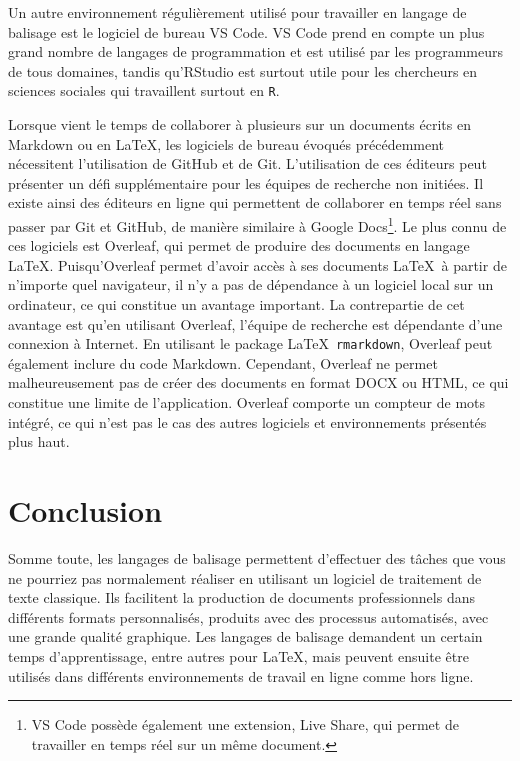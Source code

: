 \documentclass[
  letterpaper,
]{scrbook}
\begin{document}
Un autre environnement régulièrement utilisé pour travailler en langage
de balisage est le logiciel de bureau VS Code. VS Code prend en compte
un plus grand nombre de langages de programmation et est utilisé par les
programmeurs de tous domaines, tandis qu'RStudio est surtout utile pour
les chercheurs en sciences sociales qui travaillent surtout en
\texttt{R}.

Lorsque vient le temps de collaborer à plusieurs sur un documents écrits
en Markdown ou en \LaTeX, les logiciels de bureau évoqués précédemment
nécessitent l'utilisation de GitHub et de Git. L'utilisation de ces
éditeurs peut présenter un défi supplémentaire pour les équipes de
recherche non initiées. Il existe ainsi des éditeurs en ligne qui
permettent de collaborer en temps réel sans passer par Git et GitHub, de
manière similaire à Google Docs\footnote{VS Code possède également une
  extension, Live Share, qui permet de travailler en temps réel sur un
  même document.}. Le plus connu de ces logiciels est Overleaf, qui
permet de produire des documents en langage \LaTeX. Puisqu'Overleaf
permet d'avoir accès à ses documents \LaTeX~à partir de n'importe quel
navigateur, il n'y a pas de dépendance à un logiciel local sur un
ordinateur, ce qui constitue un avantage important. La contrepartie de
cet avantage est qu'en utilisant Overleaf, l'équipe de recherche est
dépendante d'une connexion à Internet. En utilisant le package
\LaTeX~\texttt{rmarkdown}, Overleaf peut également inclure du code
Markdown. Cependant, Overleaf ne permet malheureusement pas de créer des
documents en format DOCX ou HTML, ce qui constitue une limite de
l'application. Overleaf comporte un compteur de mots intégré, ce qui
n'est pas le cas des autres logiciels et environnements présentés plus
haut.

\hypertarget{conclusion}{%
\section{Conclusion}\label{conclusion}}

Somme toute, les langages de balisage permettent d'effectuer des tâches
que vous ne pourriez pas normalement réaliser en utilisant un logiciel
de traitement de texte classique. Ils facilitent la production de
documents professionnels dans différents formats personnalisés, produits
avec des processus automatisés, avec une grande qualité graphique. Les
langages de balisage demandent un certain temps d'apprentissage, entre
autres pour \LaTeX, mais peuvent ensuite être utilisés dans différents
environnements de travail en ligne comme hors ligne.
\end{document}
